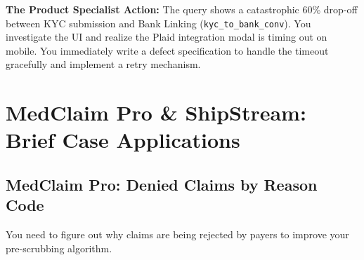 \begin{Shaded}
\begin{Highlighting}[]
    \NormalTok{((}\OperatorTok{*}  \OperatorTok{/} \NormalTok{(}\NormalTok{)), }\NormalTok{) }
    \NormalTok{((}\OperatorTok{*}  \OperatorTok{/} \NormalTok{(}\NormalTok{)), }\NormalTok{) }
\OperatorTok{=} \NormalTok{;}
\end{Highlighting}
\end{Shaded}

\textbf{The Product Specialist Action:} The query shows a catastrophic
60\% drop-off between KYC submission and Bank Linking
(\texttt{kyc\_to\_bank\_conv}). You investigate the UI and realize the
Plaid integration modal is timing out on mobile. You immediately write a
defect specification to handle the timeout gracefully and implement a
retry mechanism.

\bigskip

\section{MedClaim Pro \& ShipStream: Brief Case
Applications}\label{medclaim-pro-shipstream-brief-case-applications}

\subsection{MedClaim Pro: Denied Claims by Reason
Code}\label{medclaim-pro-denied-claims-by-reason-code}

You need to figure out why claims are being rejected by payers to
improve your pre-scrubbing algorithm.

\begin{Shaded}
\begin{Highlighting}[]
\OperatorTok{=}
\OperatorTok{=}  
  \OperatorTok{\textgreater{}=} 
 
 
 \NormalTok{;}
\end{Highlighting}
\end{Shaded}

